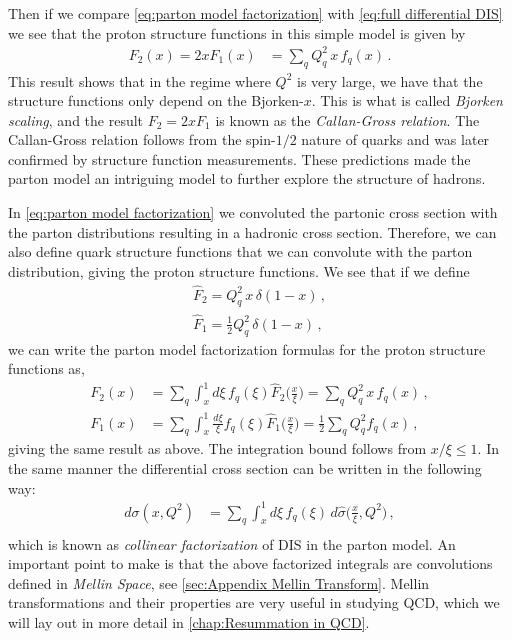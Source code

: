 Then if we compare \cref{eq:parton model factorization} with \cref{eq:full differential DIS} we see that the proton structure functions in this simple model is given by
\begin{align}\label{eq:proton structure functions F_2 and F_1}
    F_{2}(x)=2xF_{1}(x)&=\sum_{q}Q_{q}^{2}\,x\,f_{q}(x)\,.
\end{align}
This result shows that in the regime where $Q^{2}$ is very large, we have that the structure functions only depend on the Bjorken-$x$. This is what is called \emph{Bjorken scaling}, and the result $F_{2}=2xF_{1}$ is known as the \emph{Callan-Gross relation}. The Callan-Gross relation follows from the spin-$1/2$ nature of quarks and was later confirmed by structure function measurements. These predictions made the parton model an intriguing model to further explore the structure of hadrons.

In \cref{eq:parton model factorization} we convoluted the partonic cross section with the parton distributions resulting in a hadronic cross section. Therefore, we can also define quark structure functions that we can convolute with the parton distribution, giving the proton structure functions. We see that if we define
\begin{align}
    \hat{F}_{2}=Q_{q}^{2}\,x\,\delta(1-x)\,,\label{eq:quark structure function hat_F2}
    \\
    \hat{F}_{1}=\frac{1}{2}Q_{q}^{2}\,\delta(1-x)\,,\label{eq:quark structure function hat_F1}
\end{align}
we can write the parton model factorization formulas for the proton structure functions as,
\begin{align}
    F_{2}(x)&=\sum_{q}\int_{x}^{1}d\xi\,f_{q}(\xi)\hat{F}_{2}\Big(\frac{x}{\xi}\Big)=\sum_{q}Q_{q}^{2}\,x\,f_{q}(x)\label{eq:collinear factorization parton model F_2}\,,
    \\
    F_{1}(x)&=\sum_{q}\int_{x}^{1}\frac{d\xi}{\xi}f_{q}(\xi)\hat{F}_{1}\Big(\frac{x}{\xi}\Big)=\frac{1}{2}\sum_{q}Q_{q}^{2}f_{q}(x)\label{eq:collinear factorization parton model F_1}\,,
\end{align}
giving the same result as above. The integration bound follows from $x/\xi\leq 1$. In the same manner the differential cross section can be written in the following way:
\begin{align}
     d\sigma(x,Q^{2})&=\sum_{q}\int_{x}^{1}d\xi\,f_{q}(\xi)\,d\hat{\sigma}\Big(\frac{x}{\xi},Q^{2}\Big)\,,
    \\
\end{align}
which is known as \emph{collinear factorization} of DIS in the parton model. An important point to make is that the above factorized integrals are convolutions defined in \emph{Mellin Space}, see \cref{sec:Appendix Mellin Transform}. Mellin transformations and their properties are very useful in studying QCD, which we will lay out in more detail in \cref{chap:Resummation in QCD}.


